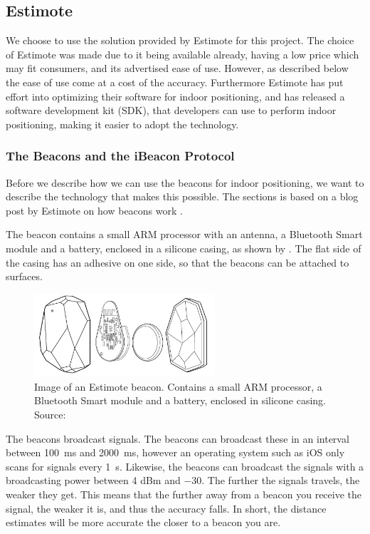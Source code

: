 \subsection{Estimote}
\label{sec:indoor-positioning:estimote}
We choose to use the solution provided by Estimote for this project.
The choice of Estimote was made due to it being available already, 
having a low price which may fit consumers, 
and its advertised ease of use. 
However, as described below the ease of use come at a cost of the accuracy.
Furthermore Estimote has put effort into optimizing their software for indoor positioning, 
and has released a software development kit (SDK),
that developers can use to perform indoor positioning, 
making it easier to adopt the technology.

\subsubsection{The Beacons and the iBeacon Protocol}
Before we describe how we can use the beacons for indoor positioning, 
we want to describe the technology that makes this possible. 
The sections is based on a blog post by Estimote on how beacons work \cite{ESTIMOTEBEACON}.

The beacon contains a small ARM processor with an antenna, 
a Bluetooth Smart module and a battery, enclosed in a silicone casing,
as shown by .
The flat side of the casing has an adhesive on one side, 
so that the beacons can be attached to surfaces. 

\begin{figure}[!htb]
  \centering
  \includegraphics[width=0.6\textwidth]{images/estimotebeacon}
  \caption{Image of an Estimote beacon. Contains a small ARM processor, a Bluetooth Smart module and a battery, enclosed in silicone casing. Source: \protect\cite{ESTIMOTEBEACON}}
  \label{fig:estimotebeacon}
\end{figure}

The beacons broadcast signals. 
The beacons can broadcast these in an interval between \SI{100}{\milli\second} and \SI{2000}{\milli\second},
however an operating system such as iOS only scans for signals every \SI{1}{\second}.
Likewise, the beacons can broadcast the signals with a broadcasting power between \num{4} dBm and \num{-30}.
The further the signals travels, the weaker they get.
This means that the further away from a beacon you receive the signal, 
the weaker it is, and thus the accuracy falls. 
In short, the distance estimates will be more accurate the closer to a beacon you are. 

